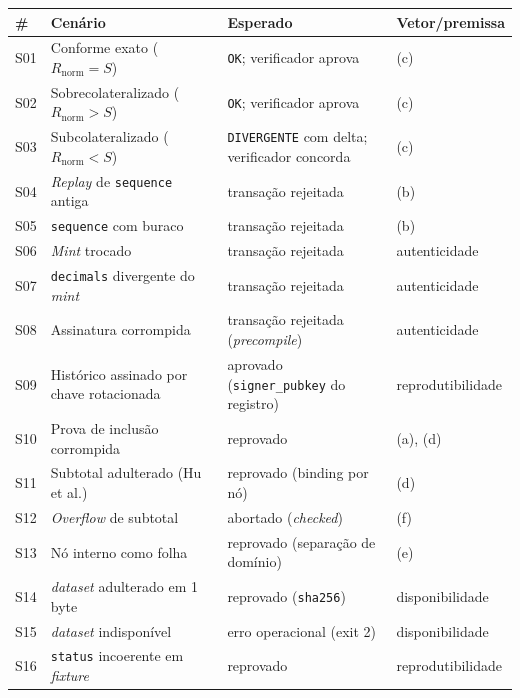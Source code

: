 \begin{tabular}{l p{5.6cm} p{4.9cm} l}
\toprule
\textbf{\#} & \textbf{Cenário} & \textbf{Esperado} & \textbf{Vetor/premissa} \\
\midrule
S01 & Conforme exato ($R_{\mathrm{norm}} = S$) & \texttt{OK}; verificador aprova & (c) \\
S02 & Sobrecolateralizado ($R_{\mathrm{norm}} > S$) & \texttt{OK}; verificador aprova & (c) \\
S03 & Subcolateralizado ($R_{\mathrm{norm}} < S$) & \texttt{DIVERGENTE} com delta; verificador concorda & (c) \\
S04 & \textit{Replay} de \texttt{sequence} antiga & transação rejeitada & (b) \\
S05 & \texttt{sequence} com buraco & transação rejeitada & (b) \\
S06 & \textit{Mint} trocado & transação rejeitada & autenticidade \\
S07 & \texttt{decimals} divergente do \textit{mint} & transação rejeitada & autenticidade \\
S08 & Assinatura corrompida & transação rejeitada (\emph{precompile}) & autenticidade \\
S09 & Histórico assinado por chave rotacionada & aprovado (\texttt{signer\_pubkey} do registro) & reprodutibilidade \\
S10 & Prova de inclusão corrompida & reprovado & (a), (d) \\
S11 & Subtotal adulterado (Hu et al.) & reprovado (binding por nó) & (d) \\
S12 & \textit{Overflow} de subtotal & abortado (\textit{checked}) & (f) \\
S13 & Nó interno como folha & reprovado (separação de domínio) & (e) \\
S14 & \emph{dataset} adulterado em 1 byte & reprovado (\texttt{sha256}) & disponibilidade \\
S15 & \emph{dataset} indisponível & erro operacional (exit 2) & disponibilidade \\
S16 & \texttt{status} incoerente em \textit{fixture} & reprovado & reprodutibilidade \\
\bottomrule
\end{tabular}
